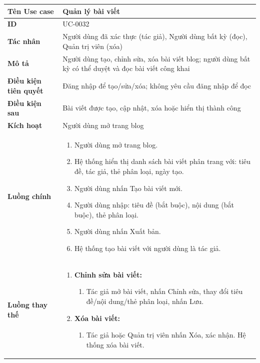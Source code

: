 {
\renewcommand{\arraystretch}{1.5}

\begin{tabularx}{\textwidth}{|>{\raggedright\arraybackslash}X|>{\raggedright\arraybackslash}X|}
\hline
\textbf{Tên Use case} & Quản lý bài viết \\
\hline
\textbf{ID} & UC-0032 \\
\hline
\textbf{Tác nhân} & Người dùng đã xác thực (tác giả), Người dùng bất kỳ (đọc), Quản trị viên (xóa) \\
\hline
\textbf{Mô tả} & Người dùng tạo, chỉnh sửa, xóa bài viết blog; người dùng bất kỳ có thể duyệt và đọc bài viết công khai \\
\hline
\textbf{Điều kiện tiên quyết} & Đăng nhập để tạo/sửa/xóa; không yêu cầu đăng nhập để đọc \\
\hline
\textbf{Điều kiện sau} & Bài viết được tạo, cập nhật, xóa hoặc hiển thị thành công \\
\hline
\textbf{Kích hoạt} & Người dùng mở trang blog \\
\hline
\textbf{Luồng chính} &
\begin{enumerate}
    \item Người dùng mở trang blog.
    \item Hệ thống hiển thị danh sách bài viết phân trang với: tiêu đề, tác giả, thẻ phân loại, ngày tạo.
    \item Người dùng nhấn Tạo bài viết mới.
    \item Người dùng nhập: tiêu đề (bắt buộc), nội dung (bắt buộc), thẻ phân loại.
    \item Người dùng nhấn Xuất bản.
    \item Hệ thống tạo bài viết với người dùng là tác giả.
\end{enumerate} \\
\hline
\textbf{Luồng thay thế} &
\begin{enumerate}
    \item \textbf{Chỉnh sửa bài viết:}
    \begin{enumerate}
        \item[3A.] Tác giả mở bài viết, nhấn Chỉnh sửa, thay đổi tiêu đề/nội dung/thẻ phân loại, nhấn Lưu.
    \end{enumerate}
    \item \textbf{Xóa bài viết:}
    \begin{enumerate}
        \item[3B.] Tác giả hoặc Quản trị viên nhấn Xóa, xác nhận. Hệ thống xóa bài viết.

\end{enumerate}
\end{enumerate}
\end{tabularx}}

